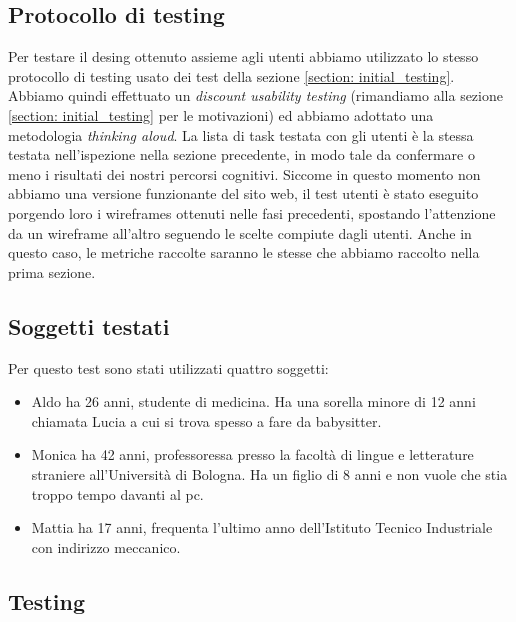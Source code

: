 \documentclass[../Report.tex]{subfiles}
\begin{document}
    \subsection{Protocollo di testing}
    Per testare il desing ottenuto assieme agli utenti abbiamo utilizzato lo stesso protocollo di testing usato dei test della sezione \ref*{section: initial_testing}. Abbiamo quindi effettuato un \emph{discount usability testing} (rimandiamo alla sezione \ref{section: initial_testing} per le motivazioni) ed abbiamo adottato una metodologia \emph{thinking aloud}. La lista di task testata con gli utenti è la stessa testata nell'ispezione nella sezione precedente, in modo tale da confermare o meno i risultati dei nostri percorsi cognitivi. Siccome in questo momento non abbiamo una versione funzionante del sito web, il test utenti è stato eseguito porgendo loro i wireframes ottenuti nelle fasi precedenti, spostando l'attenzione da un wireframe all'altro seguendo le scelte compiute dagli utenti. Anche in questo caso, 
    le metriche raccolte saranno le stesse che abbiamo raccolto nella prima sezione.
    \subsection{Soggetti testati}
    Per questo test sono stati utilizzati quattro soggetti:
    \begin{itemize}
        \item Aldo ha 26 anni, studente di medicina. Ha una sorella minore di 12 anni chiamata Lucia a cui si trova spesso a fare da babysitter.
        \item Monica ha 42 anni, professoressa presso la facoltà di lingue e letterature straniere all'Università di Bologna. Ha un figlio di 8 anni e non vuole che stia troppo tempo davanti al pc. 
        \item Mattia ha 17 anni, frequenta l'ultimo anno dell'Istituto Tecnico Industriale con indirizzo meccanico.
    \end{itemize}
    \subsection{Testing}
\end{document}
